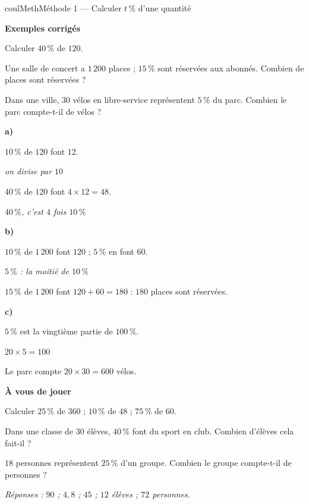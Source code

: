 \documentclass[11pt,a4paper]{article}
\makeatletter
\newcounter{lycee@signet}
\newcommand{\signet}[3][]{\stepcounter{lycee@signet}%
  \edef\lycee@dest{\if\relax\detokenize{#1}\relax
    signet.\arabic{lycee@signet}\else#1\fi}%
  \hypertarget{\lycee@dest}{}\bookmark[level=#2,dest=\lycee@dest]{#3}}
\newcommand{\res}[1]{#1}
\newcounter{methode}
\newenvironment{methodebox}[1][Méthode]{\stepcounter{methode}%
  \begin{boitecours}[phantom={\signet[methode-\arabic{methode}]{2}{#1}}]{coulMeth}{#1}}%
  {\end{boitecours}}
\newcommand{\etape}[1]{\par\smallskip\textbf{\color{coulMeth}#1}\par\nobreak\smallskip}
\newcommand{\reponse}[1]{\par\smallskip
  {\footnotesize\itshape\color{black!55}Réponses : #1}}
\newcommand{\explique}[2]{\par\smallskip\noindent
  \begin{minipage}[t]{0.57\linewidth}\raggedright #1\end{minipage}\hfill
  \begin{minipage}[t]{0.40\linewidth}\raggedright\leavevmode
    {\small\itshape\color{black!60}#2}\end{minipage}\par}
\newcommand{\cas}[1]{\par\smallskip\noindent\textbf{\color{coulExo}#1}\vadjust{\nobreak}}
\newenvironment{correction}{\par}{\par}
\newcommand{\etapeexemples}{\etape{Exemples corrigés}}
\makeatother
\begin{document}
\begin{methodebox}[Méthode 1 --- Calculer $t\,\%$ d'une quantité]
\etapeexemples
\begin{questions}[label=\alph*)]
  \item Calculer $40\,\%$ de $120$.
  \item Une salle de concert a $1\,200$ places ; $15\,\%$ sont réservées aux abonnés.
        Combien de places sont réservées ?
  \item Dans une ville, $30$ vélos en libre-service représentent $5\,\%$ du parc.
        Combien le parc compte-t-il de vélos ?
\end{questions}
\begin{correction}
\cas{a)}
\explique{$10\,\%$ de $120$ font $12$.}{on divise par $10$}
\explique{$40\,\%$ de $120$ font $4\times 12=\res{48}$.}{$40\,\%$, c'est $4$ fois
$10\,\%$}
\cas{b)}
\explique{$10\,\%$ de $1\,200$ font $120$ ; $5\,\%$ en font $60$.}{$5\,\%$ : la moitié
de $10\,\%$}
\explique{$15\,\%$ de $1\,200$ font $120+60=180$ : \res{$180$ places} sont réservées.}{}
\cas{c)}
\explique{$5\,\%$ est la vingtième partie de $100\,\%$.}{$20\times 5=100$}
\explique{Le parc compte $20\times 30=\res{600}$ vélos.}{}
\end{correction}

\etape{À vous de jouer}
\begin{questions}
  \item Calculer $25\,\%$ de $360$ ; $10\,\%$ de $48$ ; $75\,\%$ de $60$.
  \item Dans une classe de $30$ élèves, $40\,\%$ font du sport en club. Combien
        d'élèves cela fait-il ?
  \item $18$ personnes représentent $25\,\%$ d'un groupe. Combien le groupe
        compte-t-il de personnes ?
\end{questions}
\reponse{$90$ ;\; $4{,}8$ ;\; $45$ ;\; $12$ élèves ;\; $72$ personnes.}
\end{methodebox}
\end{document}
